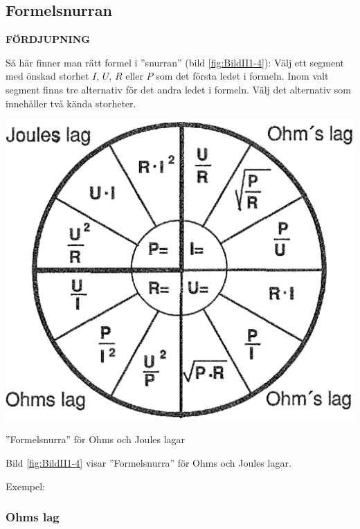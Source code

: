 \subsection{Formelsnurran}
\textbf{FÖRDJUPNING}

Så här finner man rätt formel i ''snurran'' (bild \ref{fig:BildII1-4}):
Välj ett segment med önskad storhet \(I\), \(U\), \(R\) eller \(P\) som det
första ledet i formeln.
Inom valt segment finns tre alternativ för det andra ledet i formeln.
Välj det alternativ som innehåller två kända storheter.

\begin{marginfigure}
  \includegraphics[width=\textwidth]{images/cropped_pdfs/bild_2_1-04.pdf}
  \caption{''Formelsnurra'' för Ohms och Joules lagar}
  \label{fig:BildII1-4}
\end{marginfigure}

Bild \ref{fig:BildII1-4} visar ''Formelsnurra'' för Ohms och Joules lagar.

Exempel:

\subsubsection{Ohms lag}

